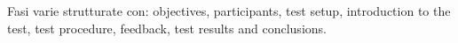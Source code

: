Fasi varie strutturate con: objectives, participants, test setup, introduction to the test, test procedure, feedback, test results and conclusions.
